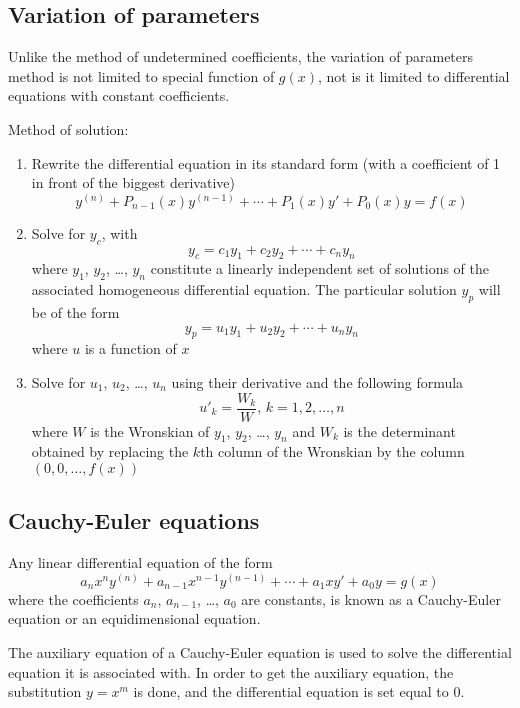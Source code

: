 \documentclass[10pt, twocolumn]{article}
\theoremstyle{definition}
\begin{document}
\subsection{Variation of parameters}
Unlike the method of undetermined coefficients, the variation of parameters method is not limited to special function of \(g(x)\), not is it limited to differential equations with constant coefficients.

Method of solution:
\begin{enumerate}
  \item Rewrite the differential equation in its standard form (with a coefficient of 1 in front of the biggest derivative)
        \[
          y^{(n)} + P_{n - 1}(x) y^{(n - 1)} + \cdots + P_1 (x) y' + P_0 (x) y = f(x)
        \]
  \item Solve for \(y_c \), with
        \[
          y_c = c_1 y_1 + c_2 y_2 + \cdots + c_n y_n
        \]
        where \(y_1 \), \(y_2 \), \dots, \(y_n \) constitute a linearly independent set of solutions of the associated homogeneous differential equation.
        The particular solution \(y_p \) will be of the form
        \[
          y_p = u_1 y_1 + u_2 y_2 + \cdots + u_n y_n
        \]
        where \(u\) is a function of \(x\)
  \item Solve for \(u_1 \), \(u_2 \), \dots, \(u_n \) using their derivative and the following formula
        \[
          u'_k = \frac{W_k }{W} \text{, } k = 1, 2, \dots, n
        \]
        where \(W\) is the Wronskian of \(y_1 \), \(y_2 \), \dots, \(y_n \) and \(W_k \) is the determinant obtained by replacing the \(k\)th column of the Wronskian by the column \((0, 0, \dots, f(x))\)
\end{enumerate}


\subsection{Cauchy-Euler equations}
Any linear differential equation of the form
\[
  a_n x^n y^{(n)} + a_{n - 1}x^{n - 1}y^{(n - 1)} + \cdots + a_1 xy' + a_0 y = g(x)
\]
where the coefficients \(a_n \), \(a_{n - 1}\), \dots, \(a_0 \) are constants, is known as a Cauchy-Euler equation or an equidimensional equation.

The auxiliary equation of a Cauchy-Euler equation is used to solve the differential equation it is associated with.
In order to get the auxiliary equation, the substitution \(y = x^m \) is done, and the differential equation is set equal to 0.
\end{document}
